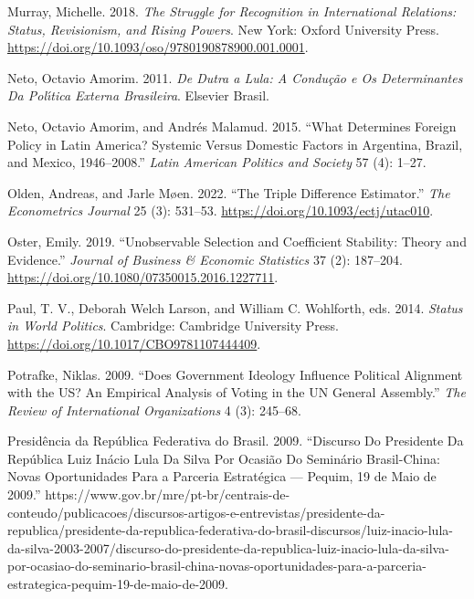 \documentclass[
  12pt,
]{article}
\newlength{\cslhangindent}
\newenvironment{CSLReferences}[2] %
 {\begin{list}{}{%
  \setlength{\itemindent}{0pt}
  \setlength{\leftmargin}{0pt}
  \setlength{\parsep}{0pt}
  \ifodd #1
   \setlength{\leftmargin}{\cslhangindent}
   \setlength{\itemindent}{-1\cslhangindent}
  \fi
  \setlength{\itemsep}{#2\baselineskip}}}
 {\end{list}}
\begin{document}
\begin{CSLReferences}{1}{0}
Murray, Michelle. 2018. \emph{The Struggle for Recognition in International Relations: Status, Revisionism, and Rising Powers}. New York: Oxford University Press. \url{https://doi.org/10.1093/oso/9780190878900.001.0001}.

Neto, Octavio Amorim. 2011. \emph{De {Dutra} a {Lula}: A Condu{ç}{ã}o e Os Determinantes Da Pol{ı́}tica Externa Brasileira}. Elsevier Brasil.

Neto, Octavio Amorim, and Andrés Malamud. 2015. {``What Determines Foreign Policy in Latin America? {Systemic} Versus Domestic Factors in Argentina, Brazil, and Mexico, 1946--2008.''} \emph{Latin American Politics and Society} 57 (4): 1--27.

Olden, Andreas, and Jarle Møen. 2022. {``The Triple Difference Estimator.''} \emph{The Econometrics Journal} 25 (3): 531--53. \url{https://doi.org/10.1093/ectj/utac010}.

Oster, Emily. 2019. {``Unobservable Selection and Coefficient Stability: Theory and Evidence.''} \emph{Journal of Business \& Economic Statistics} 37 (2): 187--204. \url{https://doi.org/10.1080/07350015.2016.1227711}.

Paul, T. V., Deborah Welch Larson, and William C. Wohlforth, eds. 2014. \emph{Status in {World Politics}}. Cambridge: Cambridge University Press. \url{https://doi.org/10.1017/CBO9781107444409}.

Potrafke, Niklas. 2009. {``Does Government Ideology Influence Political Alignment with the {US}? {An} Empirical Analysis of Voting in the {UN General Assembly}.''} \emph{The Review of International Organizations} 4 (3): 245--68.

Presidência da República Federativa do Brasil. 2009. {``Discurso Do {Presidente} Da {Rep{ú}blica Luiz In{á}cio Lula} Da {Silva} Por Ocasi{ã}o Do {Semin{á}rio Brasil-China}: {Novas} Oportunidades Para a Parceria Estrat{é}gica --- {Pequim}, 19 de Maio de 2009.''} https://www.gov.br/mre/pt-br/centrais-de-conteudo/publicacoes/discursos-artigos-e-entrevistas/presidente-da-republica/presidente-da-republica-federativa-do-brasil-discursos/luiz-inacio-lula-da-silva-2003-2007/discurso-do-presidente-da-republica-luiz-inacio-lula-da-silva-por-ocasiao-do-seminario-brasil-china-novas-oportunidades-para-a-parceria-estrategica-pequim-19-de-maio-de-2009.


\end{CSLReferences}
\end{document}

